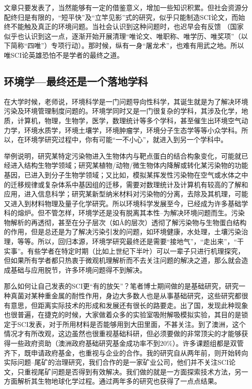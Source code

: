 \documentclass[
]{book}
\begin{document}
文章只要发表了，当然能够有一定的借鉴意义，增加一些知识积累。但社会资源分配终归是有限的，``短平快''及``立竿见影''式的研究，似乎只能制造SCI论文，而始终不能触及真正的环境问题。当社会认识到这种问题时，也迟早会有反馈 （国家似乎也认识到这一点，逐渐开始开展清理``唯论文、唯职称、唯学历、唯奖项''（以下简称``四唯''）专项行动）。那时候，纵有一身``屠龙术''，也难有用武之地。所以唯SCI论英雄恐怕不是学者的最终之道。

\hypertarget{ux73afux5883ux5b66ux6700ux7ec8ux8fd8ux662fux4e00ux4e2aux843dux5730ux5b66ux79d1}{%
\subsection{环境学---最终还是一个落地学科}\label{ux73afux5883ux5b66ux6700ux7ec8ux8fd8ux662fux4e00ux4e2aux843dux5730ux5b66ux79d1}}

在大学时候，老师说，环境科学是一门问题导向性科学，其诞生就是为了解决环境污染及环境管理制度问题的。环境学同时又是一门很复杂的学科，其涉及化学，地质，计算机，物理，生物学，医学，数理统计等多个学科，甚至催生出环境空气动力学，环境水质学，环境土壤学，环境肿瘤学，环境分子生态学等等小众学科。所以，在环境学研究过程中，你有可能``一不小心''，就进入到另一个学科中。

举例说明，研究某特定污染物进入生物体内与靶点蛋白的结合构象变化，可能就已经进入结构生物学领域；研究某植物/动物/微生物体内降解或转化某污染物的功能基因，已进入到分子生物学领域；又比如，模拟某挥发性污染物在空气或水体之中的迁移规律或复杂体系中基因组的迁移，需要对数理统计及计算机有较高的了解和应用，进入信息科学；研究某新型纳米材料对污染物的分离，去除及其机理，可能又进入到材料物理及量子化学研究。所以环境科学发展至今，已经成为许多基础学科的熔炉。但不管怎样，环境学还是没有脱离其本性--为解决环境问题而生。污染物解析的再透彻，甚至在分子层次（如Å的层次）透彻了解污染物与生物蛋白结构的作用，但是总还是为了解决污染引发的问题，如环境健康，水处理，土壤污染治理，等等。所以，回归本源，环境学研究最终还是需要``接地气''，``走出来''，``干实事''。有些学者在特定时期（比如上世纪下半叶）可以一辈子只进行机理探究，但如果所有学者都只热衷于微观机理解析而不去关注问题的解决之道，那么就会造成基础与应用脱节，许多环境问题得不到解决。

那么如何让自己发表的SCI更``有的放矢''？笔者博士期间做的是基础研究，研究一种真菌对某种重金属的耐性作用，身边大多数人也是从事基础研究，这些研究都很有意思，但距离实际技术的形成和发展还有很长的路要走。出了国，发现此种现象也很普遍，在捷克的时候，大家做着众多的实验室吸附解吸模拟实验，其目的是锁定于SCI发表，对于所用材料是否能够用到大田里面，不甚关注。到了澳洲，这个情况才有所改观，这边虽然也很重视基础科研，但必须要做的非常顶尖的才能够获得一些政府资助（澳洲政府基础研究基金成功率不到20\%）。许多课题组都是双管齐下，既申请政府基金，也重视与企业的合作。我的研究自从两年前，则开始转向实际问题--尾矿的治理研究，我们合作的是一家矿业公司，他们并不关注SCI论文，只重视尾矿问题是否得到有效解决。我们做的就是一方面探索技术方法，另一方面解析其生物地球化学过程。通过两年多的研究也获得了一点点结果。
\end{document}
